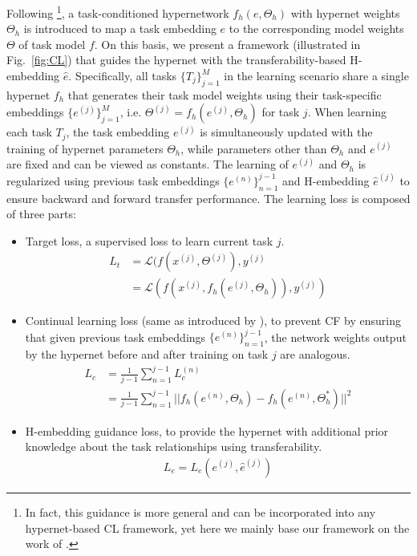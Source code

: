 Following \cite{von2020continual}\footnote{In fact, this guidance is more general and can be incorporated into any hypernet-based CL framework, yet here we mainly base our framework on the work of \cite{von2020continual}.}, a task-conditioned hypernetwork $f_h(e, \Theta_h)$ with hypernet weights $\Theta_h$ is introduced to map a task embedding $e$ to the corresponding model weights $\Theta$ of task model $f$. On this basis, we present a framework (illustrated in Fig.~\ref{fig:CL}) that guides the hypernet with the transferability-based H-embedding $\hat{e}$. Specifically, all tasks $\{T_j\}_{j=1}^M$ in the learning scenario share a single hypernet $f_h$ that generates their task model weights using their task-specific embeddings $\{e^{(j)}\}_{j=1}^M$, i.e. $\Theta^{(j)}=f_h(e^{(j)}, \Theta_h)$ for task $j$. When learning each task $T_j$, the task embedding $e^{(j)}$ is simultaneously updated with the training of hypernet parameters $\Theta_h$, while parameters other than $\Theta_h$ and $e^{(j)}$ are fixed and can be viewed as constants. The learning of $e^{(j)}$ and $\Theta_h$ is regularized using previous task embeddings $\{e^{(n)}\}_{n=1}^{j-1}$ and H-embedding $\hat{e}^{(j)}$ to ensure backward and forward transfer performance. The learning loss is composed of three parts:
\begin{itemize}
    \item Target loss, a supervised loss to learn current task $j$.
    \begin{align}
        L_t &=  \mathcal{L}(f(x^{(j)},\Theta^{(j)}),y^{(j)} \\
        &=  \mathcal{L}(f(x^{(j)},f_h(e^{(j)},\Theta_h)),y^{(j)}) \nonumber
    \end{align}
    \item Continual learning loss (same as introduced by \cite{von2020continual}), to prevent CF by ensuring that given previous task embeddings $\{e^{(n)}\}_{n=1}^{j-1}$, the network weights output by the hypernet before and after training on task $j$ are analogous.
    \begin{align}
        L_c &=\frac{1}{j-1}\sum_{n=1}^{j-1} L_c^{(n)} \\
        &= \frac{1}{j-1}\sum_{n=1}^{j-1}||f_h(e^{(n)},\Theta_h) - f_h(e^{(n)},\Theta_h^*)||^2 \nonumber
    \end{align}
    \item H-embedding guidance loss, to provide the hypernet with additional prior knowledge about the task relationships using transferability.
    \begin{align}
         L_e = L_e(e^{(j)},\hat{e}^{(j)})
    \end{align}
\end{itemize}

